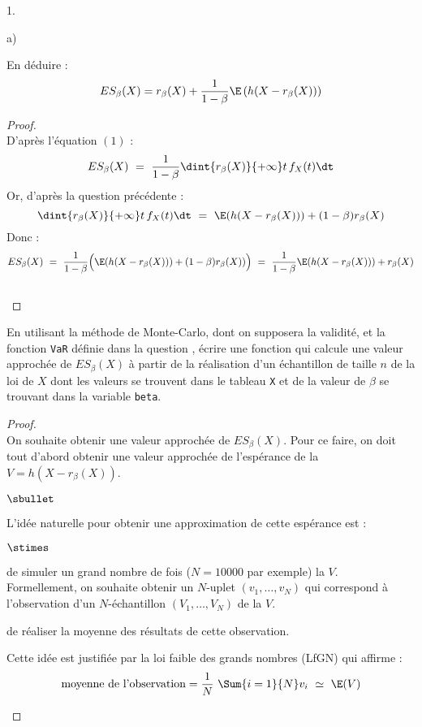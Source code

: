 \documentclass[11pt]{article}%
\begin{document}
\begin{noliste}{1.}
\begin{noliste}{a)}
    
    \item En déduire : 
    \[
      ES_\beta(X)=r_\beta(X)+\dfrac{1}{1-\beta} 
      \E\left(h(X-r_\beta(X))\right)
    \]
    
    \begin{proof}~\\
      D'après l'équation $(1)$ :
      \[
        ES_\beta(X) \ = \ \dfrac{1}{1-\beta} \dint{r_\beta(X)}{+\infty}
        t \, f_X(t) \dt
      \]
      Or, d'après la question précédente :
      \[
        \dint{r_\beta(X)}{+\infty} t \, f_X(t) \dt \ = \ 
        \E(h(X- r_\beta(X))) + (1-\beta) r_\beta(X)
      \]
      Donc : 
      \[
        ES_\beta(X) \ = \ \dfrac{1}{1-\beta} \Big(
        \E(h(X- r_\beta(X))) + (1-\beta) r_\beta(X)) \Big) \ = \
        \dfrac{1}{1-\beta} \E(h(X- r_\beta(X))) + r_\beta(X)
      \]
      ~\\[-1cm]
    \end{proof}
  \end{noliste}
  
  
  
  
  
  
  \item En utilisant la méthode de Monte-Carlo, dont on supposera 
  la validité, et la fonction {\tt VaR} définie dans la question 
  \itbf{11.}, écrire une fonction \Scilab{} qui calcule une valeur 
  approchée de $ES_\beta(X)$ à partir de la réalisation d'un 
  échantillon de taille $n$ de la loi de $X$ dont les valeurs se 
  trouvent dans le tableau \Scilab{} {\tt X} et de la valeur de 
  $\beta$ se trouvant dans la variable \Scilab{} {\tt beta}.
  
  \begin{proof}~\\%
    On souhaite obtenir une valeur approchée de $ES_{\beta}(X)$. Pour
    ce faire, on doit tout d'abord obtenir une valeur approchée de
    l'espérance de la \var $V = h(X- r_\beta(X))$.
    \begin{noliste}{$\sbullet$}
    \item L'idée naturelle pour obtenir une approximation de cette
      espérance est :
      \begin{noliste}{$\stimes$}
      \item de simuler un grand nombre de fois ($N = 10000$ par
        exemple) la \var $V$.\\
        Formellement, on souhaite obtenir un $N$-uplet $(v_1,
        \ldots, v_N)$ qui correspond à l'observation d'un
        $N$-échantillon $(V_1, \ldots, V_N)$ de la \var $V$.
      \item de réaliser la moyenne des résultats de cette
        observation.
      \end{noliste}
      Cette idée est justifiée par la loi faible des grands nombres
      (LfGN) qui affirme :
      \[
      \mbox{moyenne de l'observation} = \dfrac{1}{N} \ \Sum{i =
        1}{N} v_i \ \simeq \ \E(V)
      \]


\end{noliste}
\end{proof}
\end{noliste}
\end{document}
